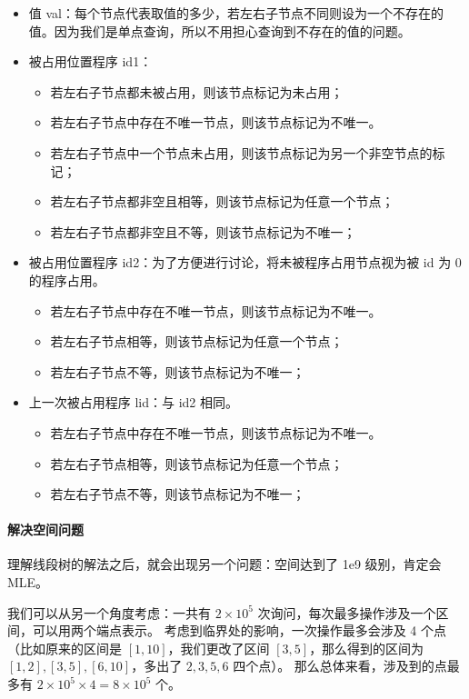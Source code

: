 \begin{itemize}
  \item 值 val：每个节点代表取值的多少，若左右子节点不同则设为一个不存在的值。因为我们是单点查询，所以不用担心查询到不存在的值的问题。
  \item 被占用位置程序 id1：
        \begin{itemize}
          \item 若左右子节点都未被占用，则该节点标记为未占用；
          \item 若左右子节点中存在不唯一节点，则该节点标记为不唯一。
          \item 若左右子节点中一个节点未占用，则该节点标记为另一个非空节点的标记；
          \item 若左右子节点都非空且相等，则该节点标记为任意一个节点；
          \item 若左右子节点都非空且不等，则该节点标记为不唯一；
        \end{itemize}
  \item 被占用位置程序 id2：为了方便进行讨论，将未被程序占用节点视为被 id 为 0 的程序占用。
        \begin{itemize}
          \item 若左右子节点中存在不唯一节点，则该节点标记为不唯一。
          \item 若左右子节点相等，则该节点标记为任意一个节点；
          \item 若左右子节点不等，则该节点标记为不唯一；
        \end{itemize}
  \item 上一次被占用程序 lid：与 id2 相同。
        \begin{itemize}
          \item 若左右子节点中存在不唯一节点，则该节点标记为不唯一。
          \item 若左右子节点相等，则该节点标记为任意一个节点；
          \item 若左右子节点不等，则该节点标记为不唯一；
        \end{itemize}
\end{itemize}

\paragraph{解决空间问题}

理解线段树的解法之后，就会出现另一个问题：空间达到了 1e9 级别，肯定会 MLE。

我们可以从另一个角度考虑：一共有 $2\times 10^5$ 次询问，每次最多操作涉及一个区间，可以用两个端点表示。
考虑到临界处的影响，一次操作最多会涉及 4 个点
（比如原来的区间是 $[1, 10]$，我们更改了区间 $[3,5]$，那么得到的区间为 $[1,2],[3,5],[6,10]$，多出了 $2,3,5,6$ 四个点）。
那么总体来看，涉及到的点最多有 $2\times 10^5\times 4 = 8\times 10^5$ 个。


